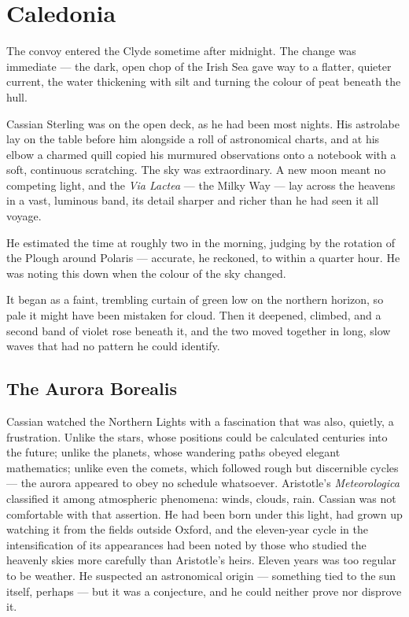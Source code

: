 
\chapter{Caledonia}

The convoy entered the Clyde sometime after midnight. The change was immediate --- the dark, open chop of the Irish Sea gave way to a flatter, quieter current, the water thickening with silt and turning the colour of peat beneath the hull.

Cassian Sterling was on the open deck, as he had been most nights. His astrolabe lay on the table before him alongside a roll of astronomical charts, and at his elbow a charmed quill copied his murmured observations onto a notebook with a soft, continuous scratching. The sky was extraordinary. A new moon meant no competing light, and the \textit{Via Lactea} --- the Milky Way --- lay across the heavens in a vast, luminous band, its detail sharper and richer than he had seen it all voyage.

He estimated the time at roughly two in the morning, judging by the rotation of the Plough around Polaris --- accurate, he reckoned, to within a quarter hour. He was noting this down when the colour of the sky changed.

It began as a faint, trembling curtain of green low on the northern horizon, so pale it might have been mistaken for cloud. Then it deepened, climbed, and a second band of violet rose beneath it, and the two moved together in long, slow waves that had no pattern he could identify.

\section*{The Aurora Borealis}

Cassian watched the Northern Lights with a fascination that was also, quietly, a frustration. Unlike the stars, whose positions could be calculated centuries into the future; unlike the planets, whose wandering paths obeyed elegant mathematics; unlike even the comets, which followed rough but discernible cycles --- the aurora appeared to obey no schedule whatsoever. Aristotle's \textit{Meteorologica} classified it among atmospheric phenomena: winds, clouds, rain. Cassian was not comfortable with that assertion. He had been born under this light, had grown up watching it from the fields outside Oxford, and the eleven-year cycle in the intensification of its appearances had been noted by those who studied the heavenly skies more carefully than Aristotle's heirs. Eleven years was too regular to be weather. He suspected an astronomical origin --- something tied to the sun itself, perhaps --- but it was a conjecture, and he could neither prove nor disprove it.

